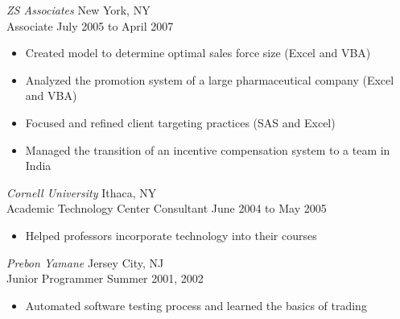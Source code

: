 \documentclass{res}
\begin{document}
\begin{resume}
{\sl ZS Associates} \hfill New York, NY \\
Associate \hfill July 2005 to April 2007
 \begin{itemize} \itemsep -2pt
  \item Created model to determine optimal sales force size (Excel and VBA)
  \item Analyzed the promotion system of a large pharmaceutical company (Excel and VBA)
  \item Focused and refined client targeting practices (SAS and Excel)
  \item Managed the transition of an incentive compensation system to a team in India
\end{itemize} \vspace{-6pt}

{\sl Cornell University} \hfill Ithaca, NY \\
Academic Technology Center Consultant \hfill June 2004 to May 2005
 \begin{itemize} \itemsep -2pt
  \item Helped professors incorporate technology into their courses
\end{itemize} \vspace{-6pt}

{\sl Prebon Yamane} \hfill Jersey City, NJ \\
Junior Programmer \hfill Summer 2001, 2002
 \begin{itemize} \itemsep -2pt
  \item Automated software testing process and learned the basics of trading
\end{itemize} \vspace{-6pt}
 
\vspace{0.02in}

\end{resume}
\end{document}
